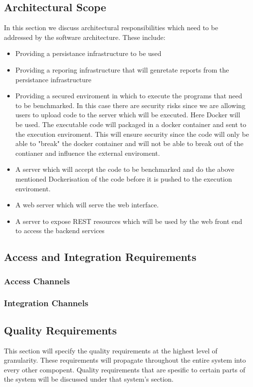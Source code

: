 \subsection{Architectural Scope}
In this section we discuss architectural responsibilities which need to be addressed by the software
architecture. These include:\\
\begin{itemize}
	\item Providing a persistance infrastructure to be used
	\item Providing a reporing infrastructure that will genretate reports from the persistance infrastructure
	\item Providing a secured enviroment in which to execute the programs that need to be benchmarked.
	In this case there are security risks since we are allowing users to upload code to the server which
	will be executed. Here Docker will be used. The executable code will packaged in a docker container
	and sent to the execution enviroment. This will ensure security since the code will only be able to
	"break" the docker container and will not be able to break out of the contianer and influence the external
	enviroment.
	\item A server which will accept the code to be benchmarked and do the above mentioned Dockerisation of the code
	before it is pushed to the execution enviroment.
	\item A web server which will serve the web interface.
	\item A server to expose REST resources which will be used by the web front end to access the backend services
\end{itemize}

\subsection{Access and Integration Requirements}
\subsubsection{Access Channels}
\subsubsection{Integration Channels}


\subsection{Quality Requirements}
This section will specify the quality requirements at the highest level of
granularity. These requirements will propagate throughout the entire system
into every other compopent. Quality requirements that are spesific to certain
parts of the system will be discussed under that system's section.

